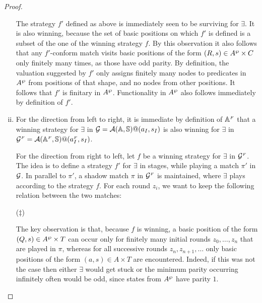 \begin{proof}
\begin{enumerate}[(i)]
\begin{enumerate}[label=(\alph*),ref=\alph*]
      \end{enumerate}
      The strategy $f'$ defined as above is immediately seen to be
      surviving for $\exists$. It is also winning, because the set of
      basic positions on which $f'$ is defined is a subset of the one
      of the winning strategy $f$. By this observation it also follows that any $f'$-conform match visits basic positions of the form $(R,s) \in A^{\wp} \times C$ only finitely many times, as those have odd parity. By definition, the valuation suggested by $f'$ only assigns finitely many nodes to predicates in $A^{\wp}$ from positions of that shape, and no nodes from other positions. It follows that $f'$ is finitary in $A^{\wp}$. Functionality in $A^{\wp}$ also follows immediately by definition of $f'$.
  \item For the direction from left to right, it is immediate by definition of $\mathbb{A}^{{\scriptscriptstyle F}}$ that a winning strategy for $\exists$ in $\mathcal{G} = \mathcal{A}(\mathbb{A},\mathbb{S})@(a_I,s_I)$ is also winning for $\exists$ in $\mathcal{G}^{{\scriptscriptstyle F}} = \mathcal{A}(\mathbb{A}^{{\scriptscriptstyle F}},\mathbb{S})@(a_I^{{\scriptscriptstyle F}},s_I)$.

      For the direction from right to left, let $f$ be a winning strategy for $\exists$ in $\mathcal{G}^{{\scriptscriptstyle F}}$. The idea is to define a strategy $f'$ for $\exists$ in stages, while playing a match $\pi'$ in $\mathcal{G}$. In parallel to $\pi'$, a shadow match $\pi$ in $\mathcal{G}^{{\scriptscriptstyle F}}$ is maintained, where $\exists$ plays according to the strategy $f$. For each round $z_i$, we want to keep the following relation between the two matches:
\smallskip
\begin{center}
\hspace*{0.3cm}($\ddag$)
\end{center}
\smallskip
The key observation is that, because $f$ is winning, a basic position of the form $(Q,s) \in A^{\wp} \times T$ can occur only for finitely many initial rounds $z_0,\dots,z_n$ that are played in $\pi$, whereas for all successive rounds $z_n,z_{n+1},\dots$ only basic positions of the form $(a,s) \in A \times T$ are encountered. Indeed, if this was not the case then either $\exists$ would get stuck or the minimum parity occurring infinitely often would be odd, since states from $A^{\wp}$ have parity $1$.


\end{enumerate}
\end{proof}
